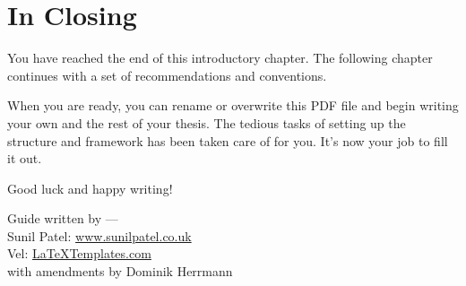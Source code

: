 \section{In Closing}

You have reached the end of this introductory chapter. The following chapter continues with a set of recommendations and conventions.

When you are ready, you can rename or overwrite this PDF file and begin writing your own  and the rest of your thesis. The tedious tasks of setting up the structure and framework has been taken care of for you. It's now your job to fill it out.

Good luck and happy writing!

\begin{flushright}
Guide written by ---\\
Sunil Patel: \href{http://www.sunilpatel.co.uk}{www.sunilpatel.co.uk}\\
Vel: \href{http://www.LaTeXTemplates.com}{LaTeXTemplates.com}\\[2ex]
with amendments by Dominik Herrmann
\end{flushright}